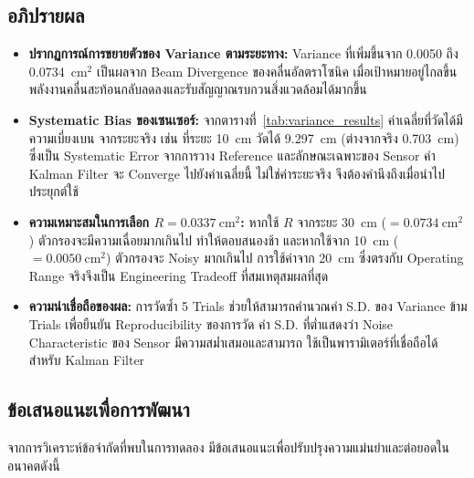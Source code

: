\subsection{อภิปรายผล}

\begin{itemize}
    \item \textbf{ปรากฏการณ์การขยายตัวของ Variance ตามระยะทาง:}
          Variance ที่เพิ่มขึ้นจาก 0.0050 ถึง 0.0734~cm$^2$ เป็นผลจาก
          Beam Divergence ของคลื่นอัลตราโซนิค เมื่อเป้าหมายอยู่ไกลขึ้น
          พลังงานคลื่นสะท้อนกลับลดลงและรับสัญญาณรบกวนสิ่งแวดล้อมได้มากขึ้น

    \item \textbf{Systematic Bias ของเซนเซอร์:}
          จากตารางที่~\ref{tab:variance_results} ค่าเฉลี่ยที่วัดได้มีความเบี่ยงเบน
          จากระยะจริง เช่น ที่ระยะ 10~cm วัดได้ 9.297~cm (ต่างจากจริง 0.703~cm)
          ซึ่งเป็น Systematic Error จากการวาง Reference และลักษณะเฉพาะของ Sensor
          ค่า Kalman Filter จะ Converge ไปยังค่าเฉลี่ยนี้ ไม่ใช่ค่าระยะจริง
          จึงต้องคำนึงถึงเมื่อนำไปประยุกต์ใช้

    \item \textbf{ความเหมาะสมในการเลือก $R = 0.0337~\text{cm}^2$:}
          หากใช้ $R$ จากระยะ 30~cm ($= 0.0734~\text{cm}^2$)
          ตัวกรองจะมีความเฉื่อยมากเกินไป ทำให้ตอบสนองช้า
          และหากใช้จาก 10~cm ($= 0.0050~\text{cm}^2$)
          ตัวกรองจะ Noisy มากเกินไป การใช้ค่าจาก 20~cm
          ซึ่งตรงกับ Operating Range จริงจึงเป็น Engineering Tradeoff
          ที่สมเหตุสมผลที่สุด

    \item \textbf{ความน่าเชื่อถือของผล:}
          การวัดซ้ำ 5 Trials ช่วยให้สามารถคำนวณค่า S.D. ของ Variance ข้าม Trials
          เพื่อยืนยัน Reproducibility ของการวัด ค่า S.D. ที่ต่ำแสดงว่า
          Noise Characteristic ของ Sensor มีความสม่ำเสมอและสามารถ
          ใช้เป็นพารามิเตอร์ที่เชื่อถือได้สำหรับ Kalman Filter
\end{itemize}

\subsection{ข้อเสนอแนะเพื่อการพัฒนา}
 
จากการวิเคราะห์ข้อจำกัดที่พบในการทดลอง มีข้อเสนอแนะเพื่อปรับปรุงความแม่นยำและต่อยอดในอนาคตดังนี้
 

